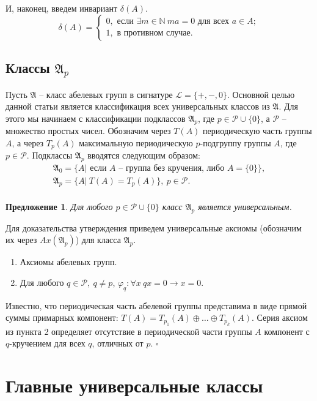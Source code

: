 \documentclass[a4paper,11pt,twoside]{article}
\newtheorem{proposition}{Предложение}[section]
\def\proof{{\noindent{\bf Доказательство.}} }
\def\A{{\mathfrak{A}}}
\def\P{{\mathcal{P}}}
\def\L{{\mathcal{L}}}
\def\N{{\mathbb{N}}}
\begin{document}
И, наконец, введем инвариант $\delta(A)$.
$$\delta(A) = \left\lbrace 
\begin{array}{l}  
0, \text{ если } \exists m \in \N \ ma = 0 \text{ для всех } a \in A; \\ 
1, \text{ в противном случае.}
\end{array} 
\right.$$


\subsection{Классы $\A_p$}

Пусть $\A$ -- класс абелевых групп в сигнатуре $\L = \{+, -, 0\}.$ Основной целью данной статьи является классификация всех универсальных классов из $\A$. Для этого мы начинаем с классификации подклассов $\A_p$, где $p \in \P \cup \{0\}$, а $\P$ -- множество простых чисел. Обозначим через $T(A)$ периодическую часть группы $A$, а через $T_p(A)$ максимальную периодическую $p$-подгруппу группы $A$, где $p \in \P$. Подклассы $\A_p$ вводятся следующим образом:
$$\begin{array}{c}
\A_0 = \{A |\text{ если } A \text{ -- группа без кручения, либо } A = \{0\} \}, \\
\A_p = \{A | \ T(A) = T_p(A)\}, \ p \in \P. \\
\end{array}$$ 

\begin{proposition}
Для любого $p \in \P \cup \{0\}$ класс $\A_p$ является универсальным.
\end{proposition}
\proof
Для доказательства утверждения приведем универсальные аксиомы (обозначим их через $Ax(\A_p)$) для класса $\A_p$. 
\begin{enumerate}
\item Аксиомы абелевых групп.
\item Для любого $q \in \P, \ q \neq p$, $\varphi_q : \forall x \ qx = 0 \rightarrow x = 0.$
\end{enumerate}

Известно, что периодическая часть абелевой группы представима в виде прямой суммы примарных компонент: $T(A) = T_{p_1}(A) \oplus \ldots \oplus T_{p_k}(A)$. Серия аксиом из пункта 2 определяет отсутствие в периодической части группы $A$ компонент с $q$-кручением для всех $q$, отличных от $p$. $\square$




\section{Главные универсальные классы}\label{sec:MainClasses}
\end{document}
